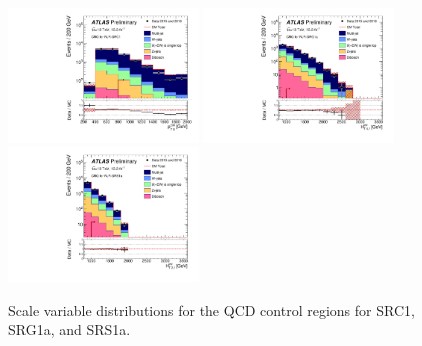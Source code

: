 \begin{figure}[tbp]
\begin{center}
\includegraphics[width=0.45\textwidth]{figures/ATLAS-CONF-2016-078_INT/N-1Plots/AtlasStyle/Preliminary/CRQ_SRJigsawSRC1_LastCut_CRQ_minusone}
\includegraphics[width=0.45\textwidth]{figures/ATLAS-CONF-2016-078_INT/N-1Plots/AtlasStyle/Preliminary/CRQ_SRJigsawSRG1a_LastCut_CRQ_minusone}
\includegraphics[width=0.45\textwidth]{figures/ATLAS-CONF-2016-078_INT/N-1Plots/AtlasStyle/Preliminary/CRQ_SRJigsawSRS1a_LastCut_CRQ_minusone}
\end{center}
\caption{Scale variable distributions for the QCD control regions for SRC1, SRG1a, and SRS1a.}
\label{fig:CRQ}
\end{figure}

